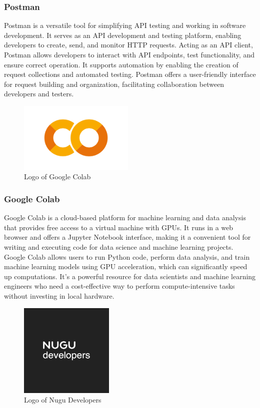 \documentclass[conference]{IEEEtran}
\begin{document}
        \subsubsection{Postman}
        Postman is a versatile tool for simplifying API testing and working in software development. It serves as an API development and testing platform, enabling developers to create, send, and monitor HTTP requests. Acting as an API client, Postman allows developers to interact with API endpoints, test functionality, and ensure correct operation. It supports automation by enabling the creation of request collections and automated testing. Postman offers a user-friendly interface for request building and organization, facilitating collaboration between developers and testers.\\

        \begin{figure}[htbp]
        \centerline{\includegraphics[width=5.5cm]{Images/logo/colab.png}}
        \label{fig}
        \caption{Logo of Google Colab}
        \end{figure}
        \subsubsection{Google Colab}
        Google Colab is a cloud-based platform for machine learning and data analysis that provides free access to a virtual machine with GPUs. It runs in a web browser and offers a Jupyter Notebook interface, making it a convenient tool for writing and executing code for data science and machine learning projects. Google Colab allows users to run Python code, perform data analysis, and train machine learning models using GPU acceleration, which can significantly speed up computations. It's a powerful resource for data scientists and machine learning engineers who need a cost-effective way to perform compute-intensive tasks without investing in local hardware.\\

        \begin{figure}[htbp]
        \centerline{\includegraphics[width=4.5cm]{Images/logo/nugu.png}}
        \label{fig}
        \caption{Logo of Nugu Developers}
        \end{figure}
\end{document}
